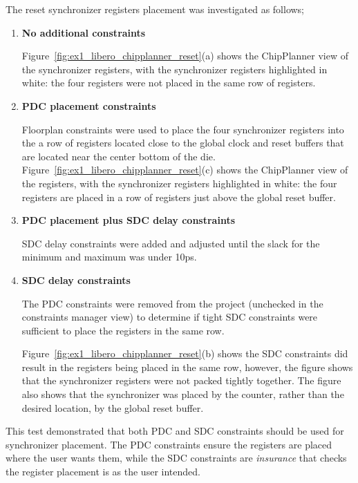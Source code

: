 The reset synchronizer registers placement was investigated as follows;
%
\begin{enumerate}
\item \textbf{No additional constraints}

Figure~\ref{fig:ex1_libero_chipplanner_reset}(a) shows the
ChipPlanner view of the synchronizer registers, with the synchronizer
registers highlighted in white:
the four registers were not placed in the same row of registers.

\item \textbf{PDC placement constraints}

Floorplan constraints were used to place the four synchronizer registers
into the a row of registers located close to the global clock and reset
buffers that are located near the center bottom of the die.
Figure~\ref{fig:ex1_libero_chipplanner_reset}(c) shows the
ChipPlanner view of the registers, with the synchronizer registers
highlighted in white: the four registers are placed in a row of
registers just above the global reset buffer.

\item \textbf{PDC placement plus SDC delay constraints}

SDC delay constraints were added and adjusted until the slack for
the minimum and maximum was under 10ps.

\item \textbf{SDC delay constraints}

The PDC constraints were removed from the project (unchecked in the
constraints manager view) to determine if tight SDC constraints were
sufficient to place the registers in the same row.

Figure~\ref{fig:ex1_libero_chipplanner_reset}(b) shows the
SDC constraints did result in the registers being placed in the same row,
however, the figure shows that the synchronizer registers were not packed
tightly together. The figure also shows that the synchronizer was placed
by the counter, rather than the desired location, by the global reset buffer.

\end{enumerate}
%
This test demonstrated that both PDC and SDC constraints should be used
for synchronizer placement. The PDC constraints ensure the registers are
placed where the user wants them, while the SDC constraints are
\emph{insurance} that checks the register placement is as the user intended.

